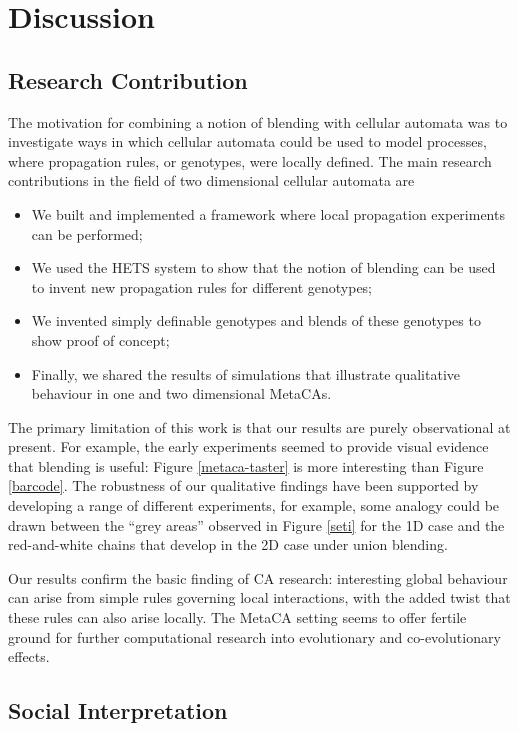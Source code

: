 \documentclass{AISB2008}
\begin{document}
\FloatBarrier

\section{Discussion}

\subsection{Research Contribution}

The motivation for combining a notion of blending with cellular
automata was to investigate ways in which cellular automata could be
used to model processes, where propagation rules, or genotypes, were
locally defined.  The main research contributions in the field of two
dimensional cellular automata are
\begin{itemize}
\item We built and implemented a framework where local propagation
  experiments can be performed;
\item We used the HETS system to show that the notion of blending can
  be used to invent new propagation rules for different genotypes;
\item We invented simply definable genotypes and blends of these
  genotypes to show proof of concept;
\item Finally, we shared the results of simulations that illustrate
  qualitative behaviour in one and two dimensional MetaCAs.
\end{itemize}

The primary limitation of this work is that our results are purely
observational at present.  For example, the early experiments seemed
to provide visual evidence that blending is useful: Figure
\ref{metaca-taster} is more interesting than Figure \ref{barcode}.  The
robustness of our qualitative findings have been supported by
developing a range of different experiments, for example, some analogy
could be drawn between the ``grey areas'' observed in Figure
\ref{seti} for the 1D case and the red-and-white chains that develop
in the 2D case under union blending.

Our results confirm the basic finding of CA research: interesting
global behaviour can arise from simple rules governing local
interactions, with the added twist that these rules can also arise locally.
The MetaCA setting seems to offer fertile ground for further
computational research into evolutionary and co-evolutionary effects.

\subsection{Social Interpretation}
\end{document}
